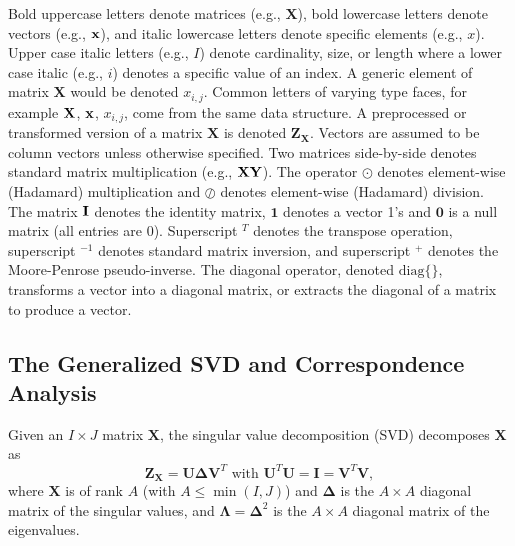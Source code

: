 \documentclass[12pt]{article}
\begin{document}
Bold uppercase letters denote matrices (e.g., \(\mathbf{X}\)), bold
lowercase letters denote vectors (e.g., \(\bf{x}\)), and italic
lowercase letters denote specific elements (e.g., \(x\)). Upper case
italic letters (e.g., \(I\)) denote cardinality, size, or length where a
lower case italic (e.g., \(i\)) denotes a specific value of an index. A
generic element of matrix \(\mathbf{X}\) would be denoted \(x_{i,j}\).
Common letters of varying type faces, for example \({\bf X}\),
\(\bf{x}\), \(x_{i,j}\), come from the same data structure. A
preprocessed or transformed version of a matrix \({\mathbf X}\) is
denoted \({\mathbf Z}_{\mathbf X}\). Vectors are assumed to be column
vectors unless otherwise specified. Two matrices side-by-side denotes
standard matrix multiplication (e.g., \(\bf{X}\bf{Y}\)). The operator
\(\odot\) denotes element-wise (Hadamard) multiplication and \(\oslash\)
denotes element-wise (Hadamard) division. The matrix \({\bf I}\) denotes
the identity matrix, \(\mathbf{1}\) denotes a vector 1's and
\({\mathbf 0}\) is a null matrix (all entries are \(0\)). Superscript
\(^{T}\) denotes the transpose operation, superscript \(^{-1}\) denotes
standard matrix inversion, and superscript \(^{+}\) denotes the
Moore-Penrose pseudo-inverse. The diagonal operator, denoted
\(\mathrm{diag\{\}}\), transforms a vector into a diagonal matrix, or
extracts the diagonal of a matrix to produce a vector.

\hypertarget{the-generalized-svd-and-correspondence-analysis}{%
\subsection{The Generalized SVD and Correspondence
Analysis}\label{the-generalized-svd-and-correspondence-analysis}}

\label{section:GSVDCA}

Given an \(I \times J\) matrix \({\mathbf X}\), the singular value
decomposition (SVD) decomposes \({\mathbf X}\) as
\begin{equation}\label{eq:svd}
{\mathbf Z}_{\mathbf X} = 
{\mathbf U} {\boldsymbol \Delta} {\mathbf V}^{T}
\textrm{ with } {\mathbf U}^{T}{\mathbf U} 
= {\mathbf I} = {\mathbf V}^{T}{\mathbf V},
\end{equation} where \({\mathbf X}\) is of rank \(A\) (with
\(A \leq \min(I,J)\)) and \({\boldsymbol \Delta}\) is the \(A \times A\)
diagonal matrix of the singular values, and
\({\boldsymbol \Lambda} = {\boldsymbol \Delta}^2\) is the \(A \times A\)
diagonal matrix of the eigenvalues.
\end{document}
